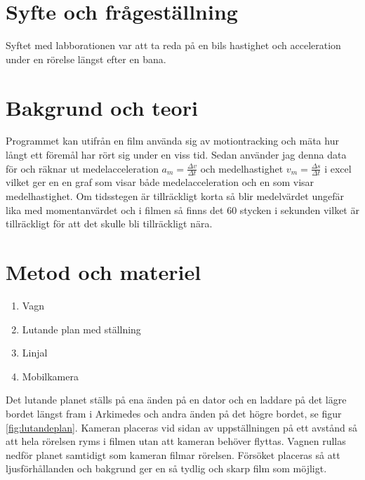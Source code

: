 \documentclass[11p, titlepage, oneside, a4paper]{article}
\begin{document}
	\newpage

	
	\setlength{\parindent}{0pt}
	\setlength{\parskip}{10pt}
	
	\section{Syfte och frågeställning}
		Syftet med labborationen var att ta reda på en bils hastighet och acceleration under en rörelse längst efter en bana.

	\section{Bakgrund och teori}
	    Programmet kan utifrån en film använda sig av motiontracking och mäta hur långt ett föremål har rört sig under en viss tid. Sedan använder jag denna data för och räknar ut medelacceleration $a_m = \frac{\Delta v}{\Delta t}$ och medelhastighet $v_m = \frac{\Delta s}{\Delta t}$ i excel vilket ger en en graf som visar både medelacceleration och en som visar medelhastighet. Om tidsstegen är tillräckligt korta så blir medelvärdet ungefär lika med momentanvärdet och i filmen så finns det 60 stycken i sekunden vilket är tillräckligt för att det skulle bli tillräckligt nära.

	\section{Metod och materiel}
        \begin{enumerate}
            \item Vagn
            \item Lutande plan med ställning
            \item Linjal
            \item Mobilkamera
        \end{enumerate}
        
        Det lutande planet ställs på ena änden på en dator och en laddare på det lägre bordet längst fram i Arkimedes och andra änden på det högre bordet, se figur \ref{fig:lutandeplan}. Kameran placeras vid sidan av uppställningen på ett avstånd så att hela rörelsen ryms i filmen utan att kameran behöver flyttas. Vagnen rullas nedför planet samtidigt som kameran filmar rörelsen. Försöket placeras så att ljusförhållanden och bakgrund ger en så tydlig och skarp film som möjligt.
        
\end{document}
